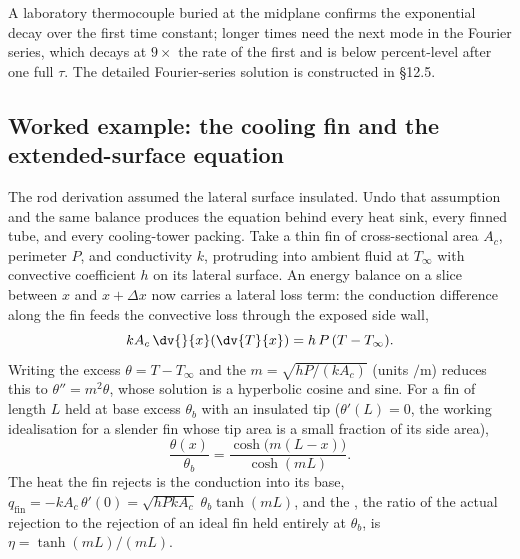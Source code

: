 A laboratory thermocouple buried at the midplane confirms the
exponential decay over the first time constant; longer times need
the next mode in the Fourier series, which decays at $9 \times$
the rate of the first and is below percent-level after one full
$\tau$. The detailed Fourier-series solution is constructed in
§12.5.



\subsection{Worked example: the cooling fin and the extended-surface equation}

The rod derivation assumed the lateral surface insulated. Undo that
assumption and the same balance produces the equation behind every
heat sink, every finned tube, and every cooling-tower packing. Take a
thin fin of cross-sectional area $A_{c}$, perimeter $P$, and
conductivity $k$, protruding into ambient fluid at $T_{\infty}$ with
convective coefficient $h$ on its lateral surface. An energy balance
on a slice between $x$ and $x + \Delta x$ now carries a lateral loss
term: the conduction difference along the fin feeds the convective
loss through the exposed side wall,
\[
k A_{c}\, \dv{}{x}\!\left(\dv{T}{x}\right) = h\, P\,(T - T_{\infty}).
\]
Writing the excess $\theta = T - T_{\infty}$ and the
 $m = \sqrt{h P/(k A_{c})}$ (units
$\si{\per\meter}$) reduces this to $\theta'' = m^{2}\theta$, whose
solution is a hyperbolic cosine and sine. For a fin of length $L$
held at base excess $\theta_{b}$ with an insulated tip
($\theta'(L) = 0$, the working idealisation for a slender fin whose
tip area is a small fraction of its side area),
\[
\frac{\theta(x)}{\theta_{b}} = \frac{\cosh\bigl(m(L - x)\bigr)}{\cosh(mL)}.
\]
The heat the fin rejects is the conduction into its base,
$q_{\text{fin}} = -k A_{c}\,\theta'(0) = \sqrt{h P k A_{c}}\;
\theta_{b}\tanh(mL)$, and the , the ratio of
the actual rejection to the rejection of an ideal fin held entirely
at $\theta_{b}$, is $\eta = \tanh(mL)/(mL)$.

